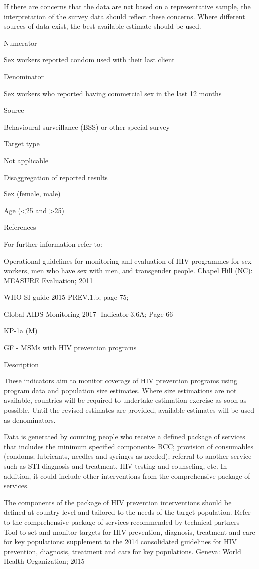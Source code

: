 \documentclass[]{book}
\begin{document}
If there are concerns that the data are not based on a representative sample, the interpretation of the survey data should reflect these concerns. Where different sources of data exist, the best available estimate should be used.

Numerator

Sex workers reported condom used with their last client

Denominator

Sex workers who reported having commercial sex in the last 12 months

Source

Behavioural surveillance (BSS) or other special survey

Target type

Not applicable

Disaggregation of reported results

Sex (female, male)

Age (\textless{}25 and \textgreater{}25)

References

For further information refer to:

Operational guidelines for monitoring and evaluation of HIV programmes for sex workers, men who have sex with men, and transgender people. Chapel Hill (NC): MEASURE Evaluation; 2011

WHO SI guide 2015-PREV.1.b; page 75;

Global AIDS Monitoring 2017- Indicator 3.6A; Page 66

KP-1a (M)

GF - MSMs with HIV prevention programs

Description

These indicators aim to monitor coverage of HIV prevention programs using program data and population size estimates. Where size estimations are not available, countries will be required to undertake estimation exercise as soon as possible. Until the revised estimates are provided, available estimates will be used as denominators.

Data is generated by counting people who receive a defined package of services that includes the minimum specified components- BCC; provision of consumables (condoms; lubricants, needles and syringes as needed); referral to another service such as STI diagnosis and treatment, HIV testing and counseling, etc. In addition, it could include other interventions from the comprehensive package of services.

The components of the package of HIV prevention interventions should be defined at country level and tailored to the needs of the target population. Refer to the comprehensive package of services recommended by technical partners-
Tool to set and monitor targets for HIV prevention, diagnosis, treatment and care for key populations: supplement to the 2014 consolidated guidelines for HIV prevention, diagnosis, treatment and care for key populations. Geneva:
World Health Organization; 2015
\end{document}
